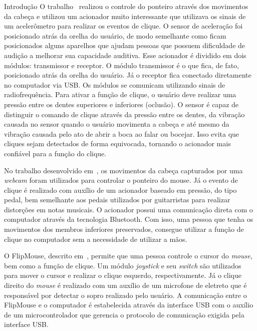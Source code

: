 \begin{chapter}{Introdução}
\newpage
O trabalho~\cite{Simpson08} realizou o controle do ponteiro através dos
movimentos da cabeça e utilizou um acionador muito interessante que
utilizava os sinais de um acelerômetro para realizar os eventos de clique. O
sensor de aceleração foi posicionado atrás da orelha do usuário, de modo
semelhante como ficam posicionados alguns aparelhos que ajudam pessoas que
possuem dificuldade de audição a melhorar sua capacidade auditiva. Esse
acionador é dividido em dois módulos: transmissor e receptor. O módulo
transmissor é o que fica, de fato, posicionado atrás da orelha do usuário. Já o
receptor fica conectado diretamente no computador via USB. Os módulos se
comunicam utilizando sinais de radiofrequência. Para ativar a função de clique,
o usuário deve realizar uma pressão entre os dentes superiores e inferiores
(oclusão).  O sensor é capaz de distinguir o comando de clique através da
pressão entre os dentes, da vibração causada no sensor quando o usuário
movimenta a cabeça e até mesmo da vibração causada pelo ato de abrir a boca ao
falar ou bocejar. Isso evita que cliques sejam detectados de forma equivocada,
tornando o acionador mais confiável para a função do clique.

No trabalho desenvolvido em~\cite{Antunes16}, os movimentos da cabeça capturados
por uma \textit{webcam} foram utilizados para controlar o ponteiro do mouse. Já
o evento de clique é realizado com auxílio de um acionador baseado em pressão,
do tipo pedal, bem semelhante aos pedais utilizados por guitarristas para
realizar distorções em notas musicais. O acionador possui uma comunicação direta
com o computador através da tecnologia Bluetooth. Com isso, uma pessoa que tenha
os movimentos dos membros inferiores preservados, consegue utilizar a função de
clique no computador sem a necessidade de utilizar a mãos. 

O FlipMouse, descrito em~\cite{Aigner16}, permite que uma pessoa controle o
cursor do \textit{mouse}, bem como a função de clique. Um módulo
\textit{joystick} e seu \textit{switch} são utilizados para mover o cursor e 
realizar o clique esquerdo, respectivamente. Já o clique direito do
\textit{mouse} é realizado com um auxílio de um microfone de eletreto que é
responsável por detectar o sopro realizado pelo usuário. A comunicação entre o
FlipMouse e o computador é estabelecida através da interface USB com o auxílio
de um microcontrolador que gerencia o protocolo de comunicação exigida pela
interface USB.


\end{chapter}
